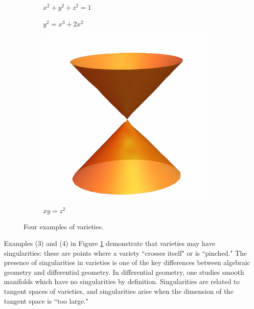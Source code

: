 \documentclass[12pt]{amsart}
\theoremstyle{plain}
\begin{document}
\begin{figure}[H]
\begin{subfigure}[t]{0.23\textwidth}
	\vspace{-1.5cm}
        \caption{$x^2 + y^2 + z^2 = 1$}
    \end{subfigure}
    \hfill
    \begin{subfigure}[t]{0.23\textwidth}
        \centering
        \vspace{-0cm} %
	 \vspace{0.1cm}
        \caption{$y^2 = x^3 + 2x^2$}
    \end{subfigure}
    \hfill
    \begin{subfigure}[t]{0.23\textwidth}
        \centering
        \vspace{-0.5cm} %
        \includegraphics[width=0.8 \linewidth]{../images/orange_cone}
        \vspace{-0.2cm} %
        \caption{$xy = z^2$}
    \end{subfigure}
    \caption{Four examples of varieties.}
	\label{figure:fourvarieties}
\end{figure}

Examples (3) and (4) in Figure \ref{figure:fourvarieties} demonstrate that varieties may have singularities: these are points where a variety ``crosses itself" or is ``pinched."
The presence of singularities in varieties is one of the key differences between algebraic geometry and differential geometry.
In differential geometry, one studies smooth manifolds which have no singularities by definition.
Singularities are related to tangent spaces of varieties, and singularities arise when the dimension of the tangent space is ``too large."
\end{document}
